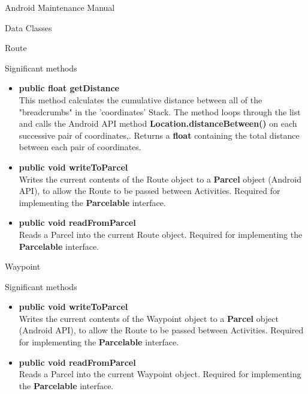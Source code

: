 \documentclass{article}
\begin{document}
\begin{section}{Android Maintenance Manual}
\begin{subsection}{Data Classes}
\begin{subsubsection}{Route}
			\begin{paragraph}{Significant methods}
				\begin{itemize}
					\item{{\bf public float getDistance} \\
					This method calculates the cumulative distance between all of the "breadcrumbs" in the 'coordinates' Stack. The method loops through the list and calls the Android API method {\bf Location.distanceBetween()} on each successive pair of coordinates,. Returns a {\bf float} containing the total distance between each pair of coordinates.}
					
					\item{{\bf public void writeToParcel} \\
					Writes the current contents of the Route object to a {\bf Parcel} object (Android API), to allow the Route to be passed between Activities. Required for implementing the {\bf Parcelable} interface.}
					
					\item{{\bf public void readFromParcel} \\
					Reads a Parcel into the current Route object. Required for implementing the {\bf Parcelable} interface.}
				\end {itemize}
			\end{paragraph}
		\end{subsubsection}
		
		\newpage
		\begin{subsubsection}{Waypoint}
			\begin{paragraph}{Significant methods}
				\begin{itemize}
					\item{{\bf public void writeToParcel} \\
					Writes the current contents of the Waypoint object to a {\bf Parcel} object (Android API), to allow the Route to be passed between Activities. Required for implementing the {\bf Parcelable} interface.}
					
					\item{{\bf public void readFromParcel} \\
					Reads a Parcel into the current Waypoint object. Required for implementing the {\bf Parcelable} interface.}
				\end {itemize}
			\end{paragraph}
		\end{subsubsection}
	\end{subsection}
	

\end{section}
\end{document}
